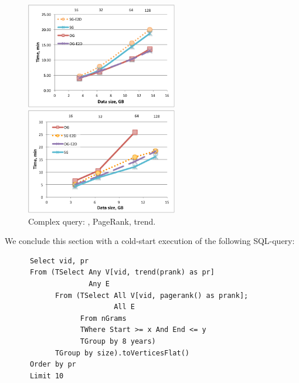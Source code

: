 \begin{figure}[t]
\centering
\begin{minipage}{3in}
  \centering
  \includegraphics[width=2.6in]{figs/trend_degrees.pdf}
  \vspace{-0.1in}
  \caption{.}
  \label{fig:trend_deg}
  \vspace{-0.1in}
\end{minipage}
\begin{minipage}{3in}
  \centering
\includegraphics[width=2.6in]{figs/complexq.pdf}
  \vspace{-0.1in}
\caption{Complex query: , PageRank, trend.}
\label{fig:complexq}
  \vspace{-0.1in}
\end{minipage}
\end{figure}


We conclude this section with a cold-start execution of
the following SQL-\ql query:

\begin{small}
\begin{verbatim}
      Select vid, pr
      From (TSelect Any V[vid, trend(prank) as pr]
                    Any E
            From (TSelect All V[vid, pagerank() as prank]; 
                          All E
                  From nGrams
                  TWhere Start >= x And End <= y
                  TGroup by 8 years)
            TGroup by size).toVerticesFlat()
      Order by pr
      Limit 10
\end{verbatim}
\end{small}

